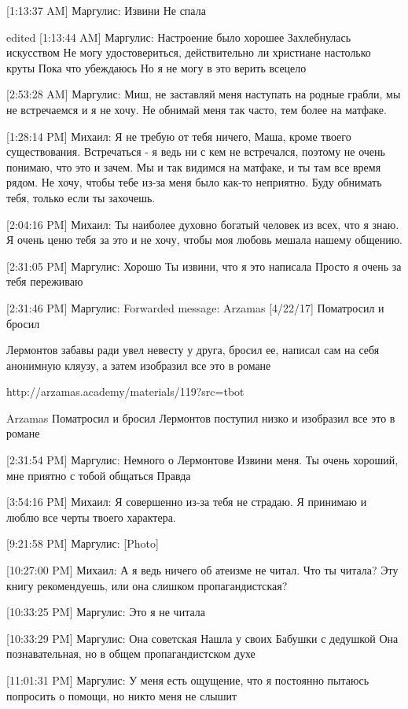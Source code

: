 \documentclass{article}
\begin{document}
[1:13:37 AM] Маргулис:
Извини
 Не спала

edited 
[1:13:44 AM] Маргулис:
Настроение было хорошее
 Захлебнулась искусством
 Не могу удостовериться, действительно ли христиане настолько круты
 Пока что убеждаюсь
 Но я не могу в это верить всецело

[2:53:28 AM] Маргулис:
Миш, не заставляй меня наступать на родные грабли, мы не встречаемся и я не хочу. Не обнимай меня так часто, тем более на матфаке.

[1:28:14 PM] Михаил:
Я не требую от тебя ничего, Маша, кроме твоего существования. Встречаться - я ведь ни с кем не встречался, поэтому не очень понимаю, что это и зачем. Мы и так видимся на матфаке, и ты там все время рядом.
 Не хочу, чтобы тебе из-за меня было как-то неприятно. Буду обнимать тебя, только если ты захочешь.

[2:04:16 PM] Михаил:
Ты наиболее духовно богатый человек из всех, что я знаю. Я очень ценю тебя за это и не хочу, чтобы моя любовь мешала нашему общению.

[2:31:05 PM] Маргулис:
Хорошо
 Ты извини, что я это написала
 Просто я очень за тебя переживаю

[2:31:46 PM] Маргулис:
Forwarded message: Arzamas [4/22/17] 
Поматросил и бросил

Лермонтов забавы ради увел невесту у друга, бросил ее, написал сам на себя анонимную кляузу, а затем изобразил все это в романе

http://arzamas.academy/materials/119?src=tbot

Arzamas
Поматросил и бросил
Лермонтов поступил низко и изобразил все это в романе

[2:31:54 PM] Маргулис:
Немного о Лермонтове
 Извини меня. Ты очень хороший, мне приятно с тобой общаться
 Правда

[3:54:16 PM] Михаил:
Я совершенно из-за тебя не страдаю. Я принимаю и люблю все черты твоего характера.

[9:21:58 PM] Маргулис:
[Photo]

[10:27:00 PM] Михаил:
А я ведь ничего об атеизме не читал. Что ты читала? Эту книгу рекомендуешь, или она слишком пропагандистская?

[10:33:25 PM] Маргулис:
Это я не читала

[10:33:29 PM] Маргулис:
Она советская
 Нашла у своих
 Бабушки с дедушкой
 Она познавательная, но в общем пропагандистском духе

[11:01:31 PM] Маргулис:
У меня есть ощущение, что я постоянно пытаюсь попросить о помощи, но никто меня не слышит
\end{document}
